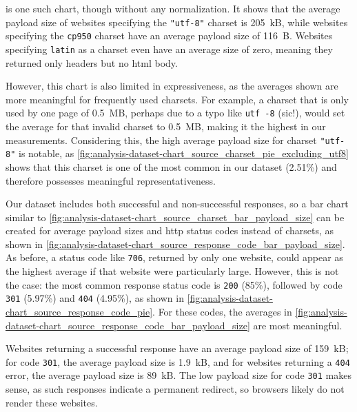  is one such chart, though without any normalization.
It shows that the average payload size of websites specifying the \texttt{"utf-8"} charset is 205~kB, while websites specifying the \texttt{cp950} charset have an average payload size of 116~B.
Websites specifying \texttt{latin} as a charset even have an average size of zero, meaning they returned only headers but no \ac{html} body.

However, this chart is also limited in expressiveness, as the averages shown are more meaningful for frequently used charsets.
For example, a charset that is only used by one page of 0.5~MB, perhaps due to a typo like \texttt{utf -8} (sic!), would set the average for that invalid charset to 0.5~MB, making it the highest in our measurements.
Considering this, the high average payload size for charset \texttt{"utf-8"} is notable, as \cref{fig:analysis-dataset-chart_source_charset_pie_excluding_utf8} shows that this charset is one of the most common in our dataset (2.51\%) and therefore possesses meaningful representativeness.

Our dataset includes both successful and non-successful responses, so a bar chart similar to \cref{fig:analysis-dataset-chart_source_charset_bar_payload_size} can be created for average payload sizes and \ac{http} status codes instead of charsets, as shown in \cref{fig:analysis-dataset-chart_source_response_code_bar_payload_size}.
As before, a status code like \texttt{706}, returned by only one website, could appear as the highest average if that website were particularly large.
However, this is not the case: the most common response status code is \texttt{200} (85\%), followed by code \texttt{301} (5.97\%) and \texttt{404} (4.95\%), as shown in \cref{fig:analysis-dataset-chart_source_response_code_pie}.
For these codes, the averages in \cref{fig:analysis-dataset-chart_source_response_code_bar_payload_size} are most meaningful.

Websites returning a successful response have an average payload size of 159~kB; for code \texttt{301}, the average payload size is 1.9~kB, and for websites returning a \texttt{404} error, the average payload size is 89~kB.
The low payload size for code \texttt{301} makes sense, as such responses indicate a permanent redirect, so browsers likely do not render these websites.

